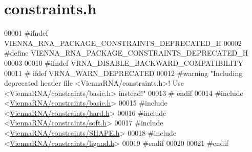 \hypertarget{constraints_8h_source}{}\section{constraints.\+h}
\label{constraints_8h_source}

\begin{DoxyCode}
00001 \textcolor{preprocessor}{#ifndef VIENNA\_RNA\_PACKAGE\_CONSTRAINTS\_DEPRECATED\_H}
00002 \textcolor{preprocessor}{#define VIENNA\_RNA\_PACKAGE\_CONSTRAINTS\_DEPRECATED\_H}
00003 
00010 \textcolor{preprocessor}{#ifndef VRNA\_DISABLE\_BACKWARD\_COMPATIBILITY}
00011 \textcolor{preprocessor}{# ifdef VRNA\_WARN\_DEPRECATED}
00012 \textcolor{preprocessor}{#warning "Including deprecated header file <ViennaRNA/constraints.h>! Use <ViennaRNA/constraints/basic.h>
       instead!"}
00013 \textcolor{preprocessor}{# endif}
00014 \textcolor{preprocessor}{#include <\hyperlink{constraints_2basic_8h}{ViennaRNA/constraints/basic.h}>}
00015 \textcolor{preprocessor}{#include <\hyperlink{hard_8h}{ViennaRNA/constraints/hard.h}>}
00016 \textcolor{preprocessor}{#include <\hyperlink{soft_8h}{ViennaRNA/constraints/soft.h}>}
00017 \textcolor{preprocessor}{#include <\hyperlink{SHAPE_8h}{ViennaRNA/constraints/SHAPE.h}>}
00018 \textcolor{preprocessor}{#include <\hyperlink{ligand_8h}{ViennaRNA/constraints/ligand.h}>}
00019 \textcolor{preprocessor}{#endif}
00020 
00021 \textcolor{preprocessor}{#endif}
\end{DoxyCode}
